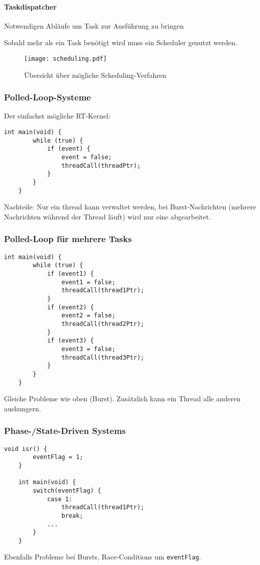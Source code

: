 \paragraph{Taskdispatcher} Notwendigen Abläufe um Task zur Ausführung zu bringen

Sobald mehr als ein Task benötigt wird muss ein Scheduler genutzt werden.
\begin{figure}[H]
    \centering
    \texttt{[image: scheduling.pdf]}
    \caption{Übersicht über mögliche Scheduling-Verfahren}
\end{figure}

\subsubsection{Polled-Loop-Systeme}
Der einfachst mögliche RT-Kernel:
\begin{lstlisting}[style=c]
    int main(void) {
        while (true) {
            if (event) {
                event = false;
                threadCall(threadPtr);
            }
        }
    }
\end{lstlisting}
Nachteile: Nur ein thread kann verwaltet werden, bei Burst-Nachrichten (mehrere Nachrichten während der Thread läuft) wird nur eine abgearbeitet.

\subsubsection{Polled-Loop für mehrere Tasks}
\begin{lstlisting}[style=c]
    int main(void) {
        while (true) {
            if (event1) {
                event1 = false;
                threadCall(thread1Ptr);
            }
            if (event2) {
                event2 = false;
                threadCall(thread2Ptr);
            }
            if (event3) {
                event3 = false;
                threadCall(thread3Ptr);
            }
        }
    }
\end{lstlisting}
Gleiche Probleme wie oben (Burst). Zusätzlich kann ein Thread alle anderen aushungern.

\subsubsection{Phase-/State-Driven Systems}
\begin{lstlisting}[style=c]
    void isr() {
        eventFlag = 1;
    }

    int main(void) {
        switch(eventFlag) {
            case 1:
                threadCall(thread1Ptr);
                break;
            ...
        }
    }
\end{lstlisting}
Ebenfalls Probleme bei Bursts, Race-Conditions um \lstinline[style=c]{eventFlag}.
